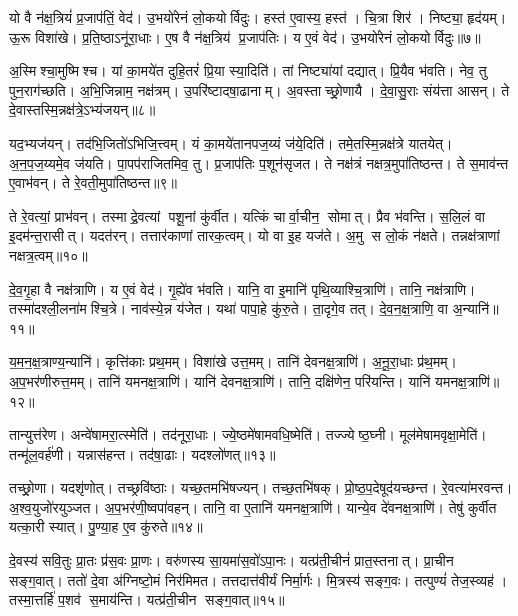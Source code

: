यो वै न॑क्ष॒त्रियं॑ प्र॒जाप॑तिं॒ वेद॑।
उ॒भयो॑रेनं लो॒कयोर्विदुः।
हस्त॑ ए॒वास्य॒ हस्त॑।
चि॒त्रा शिर॑।
निष्ट्या॒ हृद॑यम्।
ऊ॒रू विशा॑खे।
प्र॒ति॒ष्ठाऽनू॑रा॒धाः।
ए॒ष वै न॑क्ष॒त्रिय॑ प्र॒जाप॑तिः।
य ए॒वं वेद॑।
उ॒भयो॑रेनं लो॒कयोर्विदुः॥७॥

अ॒स्मिश्चा॒मुष्मिश्च।
यां का॒मये॑त दुहि॒तरं॑ प्रि॒या स्या॒दिति॑।
तां निष्ट्या॑यां दद्यात्।
प्रि॒यैव भ॑वति।
नेव॒ तु पुन॒राग॑च्छति।
अ॒भि॒जिन्नाम॒ नक्ष॑त्रम्।
उ॒परि॑ष्टादषा॒ढानाम्।
अ॒वस्ताच्छ्रो॒णायै।
दे॒वा॒सु॒राः संय॑त्ता आसन्।
ते दे॒वास्तस्मि॒न्नक्ष॑त्रे॒ऽभ्य॑जयन्॥८॥

यद॒भ्यज॑यन्।
तद॑भि॒जितो॑ऽभिजि॒त्त्वम्।
यं का॒मये॑तानपज॒य्यं ज॑ये॒दिति॑।
तमे॒तस्मि॒न्नक्ष॑त्रे यातयेत्।
अ॒न॒प॒ज॒य्यमे॒व ज॑यति।
पा॒पप॑राजितमिव॒ तु।
प्र॒जाप॑तिः प॒शून॑सृजत।
ते नक्ष॑त्रं नक्षत्र॒मुपा॑तिष्ठन्त।
ते स॒माव॑न्त ए॒वाभ॑वन्।
ते रे॒वती॒मुपा॑तिष्ठन्त॥९॥

ते रे॒वत्यां॒ प्राभ॑वन्।
तस्माद्रे॒वत्यां पशू॒नां कु॑र्वीत।
यत्किं चार्वा॒चीन॒ सोमात्।
प्रैव भ॑वन्ति।
स॒लि॒लं वा इ॒दम॑न्त॒रासीत्।
यदत॑रन्।
तत्तार॑काणां तारक॒त्वम्।
यो वा इ॒ह यज॑ते।
अ॒मु स लो॒कं न॑क्षते।
तन्नक्ष॑त्राणां नक्षत्र॒त्वम्॥१०॥

दे॒व॒गृ॒हा वै नक्ष॑त्राणि।
य ए॒वं वेद॑।
गृ॒ह्ये॑व भ॑वति।
यानि॒ वा इ॒मानि॑ पृथि॒व्याश्चि॒त्राणि॑।
तानि॒ नक्ष॑त्राणि।
तस्मा॑दश्ली॒लना॑मश्चि॒त्रे।
नाव॑स्ये॒न्न य॑जेत।
यथा॑ पापा॒हे कु॑रु॒ते।
ता॒दृगे॒व तत्।
दे॒व॒न॒क्ष॒त्राणि॒ वा अ॒न्यानि॑॥११॥

य॒म॒न॒क्ष॒त्राण्य॒न्यानि॑।
कृत्ति॑काः प्रथ॒मम्।
विशा॑खे उत्त॒मम्।
तानि॑ देवनक्ष॒त्राणि॑।
अ॒नू॒रा॒धाः प्र॑थ॒मम्।
अ॒प॒भर॑णीरुत्त॒मम्।
तानि॑ यमनक्ष॒त्राणि॑।
यानि॑ देवनक्ष॒त्राणि॑।
तानि॒ दक्षि॑णेन॒ परि॑यन्ति।
यानि॑ यमनक्ष॒त्राणि॑॥१२॥

तान्युत्त॑रेण।
अन्वे॑षामरा॒त्स्मेति॑।
तद॑नूरा॒धाः।
ज्ये॒ष्ठमे॑षाम\-वधि॒ष्मेति॑।
तज्ज्येष्ठ॒घ्नी।
मूल॑मेषामवृक्षा॒मेति॑।
तन्मू॑ल॒वर्\mbox{}ह॑णी।
यन्नास॑हन्त।
तद॑षा॒ढाः।
यदश्लो॑णत्॥१३॥

तच्छ्रो॒णा।
यदशृ॑णोत्।
तच्छ्रवि॑ष्ठाः।
यच्छ॒तमभि॑षज्यन्।
तच्छ॒तभि॑षक्।
प्रो॒ष्ठ॒प॒देषूद॑यच्छन्त।
रे॒वत्या॑मरवन्त।
अ॒श्व॒युजो॑रयुञ्जत।
अ॒प॒भर॑णी॒ष्वपा॑वहन्।
तानि॒ वा ए॒तानि॑ यमनक्ष॒त्राणि॑।
यान्ये॒व दे॑वनक्ष॒त्राणि॑।
तेषु॑ कुर्वीत यत्का॒री स्यात्।
पु॒ण्या॒ह ए॒व कु॑रुते॥१४॥

दे॒वस्य॑ सवि॒तुः प्रा॒तः प्र॑स॒वः प्रा॒णः।
वरु॑णस्य सा॒यमा॑स॒वो॑ऽपा॒नः।
यत्प्र॑ती॒चीनं॑ प्रात॒स्तनात्।
प्रा॒चीन सङ्ग॒वात्।
ततो॑ दे॒वा अ॑ग्निष्टो॒मं निर॑मिमत।
तत्तदात्त॑वीर्यं निर्मा॒र्गः।
मि॒त्रस्य॑ सङ्ग॒वः।
तत्पुण्यं॑ तेज॒स्व्यह॑।
तस्मा॒त्तर्\mbox{}हि॑ प॒शव॑ स॒माय॑न्ति।
यत्प्र॑ती॒चीन सङ्ग॒वात्॥१५॥

